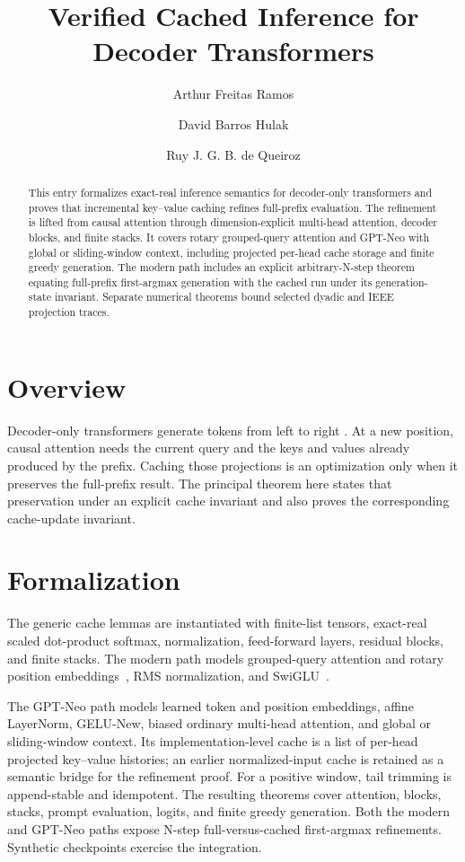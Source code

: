\documentclass[11pt,a4paper]{article}
\begin{document}
\title{Verified Cached Inference for Decoder Transformers}
\author{Arthur Freitas Ramos \and David Barros Hulak \and
  Ruy J. G. B. de Queiroz}
\maketitle

\begin{abstract}
This entry formalizes exact-real inference semantics for decoder-only
transformers and proves that incremental key--value caching refines
full-prefix evaluation.  The refinement is lifted from causal attention
through dimension-explicit multi-head attention, decoder blocks, and finite
stacks.  It covers rotary grouped-query attention and GPT-Neo with global or
sliding-window context, including projected per-head cache storage and finite
greedy generation.  The modern path includes an explicit arbitrary-N-step
theorem equating full-prefix first-argmax generation with the cached run under
its generation-state invariant.  Separate numerical theorems bound selected
dyadic and IEEE projection traces.
\end{abstract}

\tableofcontents

\section{Overview}

Decoder-only transformers generate tokens from left to right
\cite{VaswaniEtAl2017}.  At a new
position, causal attention needs the current query and the keys and values
already produced by the prefix.  Caching those projections is an optimization
only when it preserves the full-prefix result.  The principal theorem here
states that preservation under an explicit cache invariant and also proves the
corresponding cache-update invariant.

\section{Formalization}

The generic cache lemmas are instantiated with finite-list tensors, exact-real
scaled dot-product softmax, normalization, feed-forward layers, residual
blocks, and finite stacks.  The modern path models grouped-query attention
and rotary position embeddings~\cite{AinslieEtAl2023,SuEtAl2024}, RMS
normalization, and SwiGLU~\cite{Shazeer2020}.

The GPT-Neo path models learned token and position embeddings, affine
LayerNorm, GELU-New, biased ordinary multi-head attention, and global or
sliding-window context.  Its implementation-level cache is a list of
per-head projected key--value histories; an earlier normalized-input cache is
retained as a semantic bridge for the refinement proof.  For a positive
window, tail trimming is append-stable and idempotent.  The resulting
theorems cover attention, blocks, stacks, prompt evaluation, logits, and
finite greedy generation.  Both the modern and GPT-Neo paths expose N-step
full-versus-cached first-argmax refinements.  Synthetic checkpoints exercise
the integration.
\end{document}
